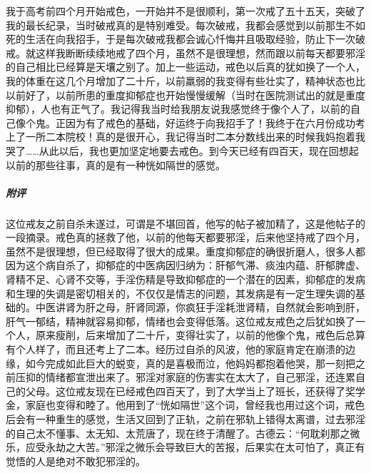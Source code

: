 \begin{case}
    我于高考前四个月开始戒色，一开始并不是很顺利，第一次戒了五十五天，突破了我的最长纪录，当时破戒真的是特别难受。每次破戒，我都会感觉到以前那生不如死的生活在向我招手，于是每次破戒我都会诚心忏悔并且吸取经验，防止下一次破戒。就这样我断断续续地戒了四个月，虽然不是很理想，然而跟以前每天都要邪淫的自己相比已经算是天壤之别了。加上一些运动，戒色以后真的犹如换了一个人，我的体重在这几个月增加了二十斤，以前羸弱的我变得有些壮实了，精神状态也比以前好了，以前所患的重度抑郁症也开始慢慢缓解（当时在医院测试出的就是重度抑郁），人也有正气了。我记得我当时给我朋友说我感觉终于像个人了，以前的自己像个鬼。正因为有了戒色的基础，好运终于向我招手了！我终于在六月份成功考上了一所二本院校！真的是很开心，我记得当时二本分数线出来的时候我妈抱着我哭了……从此以后，我也更加坚定地要去戒色。到今天已经有四百天，现在回想起以前的那些往事，真的是有一种恍如隔世的感觉。
    \subparagraph{附评} 这位戒友之前自杀未遂过，可谓是不堪回首，他写的帖子被加精了，这是他帖子的一段摘录。戒色真的拯救了他，以前的他每天都要邪淫，后来他坚持戒了四个月，虽然不是很理想，但已经取得了很大的成果。重度抑郁症的确很折磨人，很多人都因为这个病自杀了，抑郁症的中医病因归纳为：肝郁气滞、痰浊内蕴、肝郁脾虚、肾精不足、心肾不交等，手淫伤精是导致抑郁症的一个潜在的因素，抑郁症的发病和生理的失调是密切相关的，不仅仅是情志的问题，其发病是有一定生理失调的基础的。中医讲肾为肝之母，肝肾同源，你疯狂手淫耗泄肾精，自然就会影响到肝，肝气一郁结，精神就容易抑郁，情绪也会变得低落。这位戒友戒色之后犹如换了一个人，原来瘦削，后来增加了二十斤，变得壮实了，以前的他像个鬼，戒色后总算有个人样了，而且还考上了二本。经历过自杀的风波，他的家庭肯定在崩溃的边缘，如今完成如此巨大的蜕变，真的是喜极而泣，他妈妈都抱着他哭，那一刻把之前压抑的情绪都宣泄出来了。邪淫对家庭的伤害实在太大了，自己邪淫，还连累自己的父母。这位戒友现在已经戒色四百天了，到了大学当上了班长，还获得了奖学金，家庭也变得和睦了。他用到了“恍如隔世”这个词，曾经我也用过这个词，戒色后会有一种重生的感觉，生活又回到了正轨，之前在邪轨上错得太离谱，过去邪淫的自己太不懂事、太无知、太荒唐了，现在终于清醒了。古德云：“何耽刹那之微乐，应受永劫之大苦。”邪淫之微乐会导致巨大的苦报，后果实在太可怕了，真正有觉悟的人是绝对不敢犯邪淫的。
\end{case}

